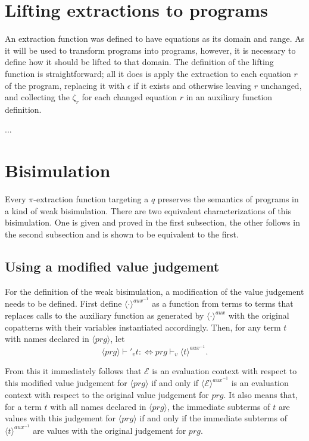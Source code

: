 \section{Lifting extractions to programs}

An extraction function was defined to have equations as its domain and range. As it will be used to transform programs into programs, however, it is necessary to define how it should be lifted to that domain. The definition of the lifting function is straightforward; all it does is apply the extraction to each equation $r$ of the program, replacing it with $\epsilon$ if it exists and otherwise leaving $r$ unchanged, and collecting the $\zeta_r$ for each changed equation $r$ in an auxiliary function definition.

...

\section{Bisimulation}

Every $\pi$-extraction function targeting a $q$ preserves the semantics of programs in a kind of weak bisimulation. There are two equivalent characterizations of this bisimulation. One is given and proved in the first subsection, the other follows in the second subsection and is shown to be equivalent to the first.

\subsection{Using a modified value judgement}

For the definition of the weak bisimulation, a modification of the value judgement needs to be defined. First define $\langle \cdot \rangle^{aux^{-1}}$ as a function from terms to terms that replaces calls to the auxiliary function as generated by $\langle \cdot \rangle^{aux}$ with the original copatterns with their variables instantiated accordingly. Then, for any term $t$ with names declared in $\langle prg \rangle$, let
\[
\langle prg \rangle \vdash'_v t :\iff prg \vdash_v \langle t \rangle^{aux^{-1}}.
\]

From this it immediately follows that $\mathcal{E}$ is an evaluation context with respect to this modified value judgement for $\langle prg \rangle$ if and only if $\langle \mathcal{E} \rangle^{aux^{-1}}$ is an evaluation context with respect to the original value judgement for $prg$. It also means that, for a term $t$ with all names declared in $\langle prg \rangle$, the immediate subterms of $t$ are values with this judgement for $\langle prg \rangle$ if and only if the immediate subterms of $\langle t \rangle^{aux^{-1}}$ are values with the original judgement for $prg$.

